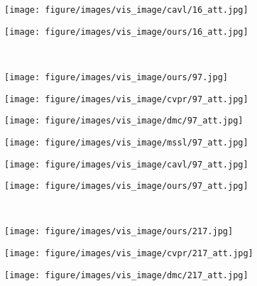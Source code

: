 \begin{figure*}[t!]
\begin{subfigure}[b]{.16\linewidth}
    \centering
    \texttt{[image: figure/images/vis\_image/cavl/16\_att.jpg]}
    \end{subfigure}
    \begin{subfigure}[b]{.16\linewidth}
    \centering
    \texttt{[image: figure/images/vis\_image/ours/16\_att.jpg]}
    \end{subfigure}
    \\
    \begin{subfigure}[b]{.16\linewidth}
    \centering
    \texttt{[image: figure/images/vis\_image/ours/97.jpg]}
    \end{subfigure}
    \begin{subfigure}[b]{.16\linewidth}
    \centering
    \texttt{[image: figure/images/vis\_image/cvpr/97\_att.jpg]}
    \end{subfigure}
    \begin{subfigure}[b]{.16\linewidth}
    \centering
    \texttt{[image: figure/images/vis\_image/dmc/97\_att.jpg]}
    \end{subfigure}  
    \begin{subfigure}[b]{.16\linewidth}
    \centering
    \texttt{[image: figure/images/vis\_image/mssl/97\_att.jpg]}
    \end{subfigure}
    \begin{subfigure}[b]{.16\linewidth}
    \centering
    \texttt{[image: figure/images/vis\_image/cavl/97\_att.jpg]}
    \end{subfigure}
    \begin{subfigure}[b]{.16\linewidth}
    \centering
    \texttt{[image: figure/images/vis\_image/ours/97\_att.jpg]}
    \end{subfigure}
    \\
    \iffalse
    \begin{subfigure}[b]{.16\linewidth}
    \centering
    \texttt{[image: figure/images/vis\_image/ours/217.jpg]}
    \end{subfigure}
    \begin{subfigure}[b]{.16\linewidth}
    \centering
    \texttt{[image: figure/images/vis\_image/cvpr/217\_att.jpg]}
    \end{subfigure}
    \begin{subfigure}[b]{.16\linewidth}
    \centering
    \texttt{[image: figure/images/vis\_image/dmc/217\_att.jpg]}
    \end{subfigure}  

\end{figure*}
